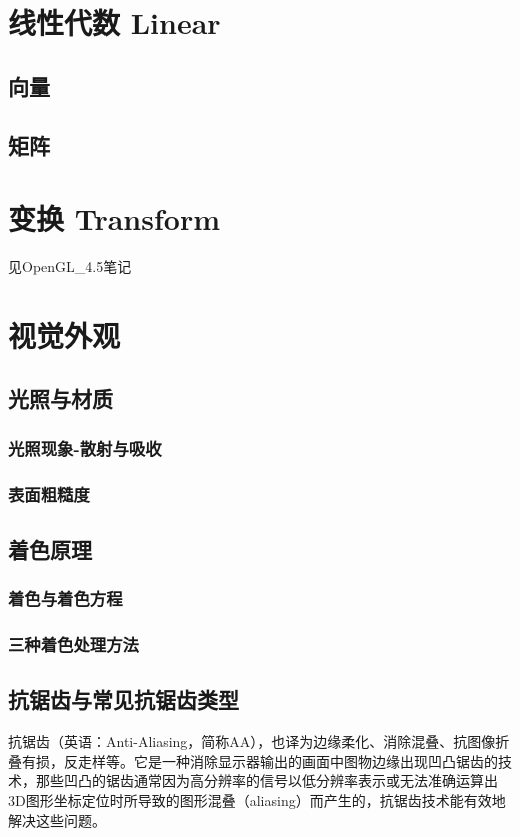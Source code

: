 \documentclass[UTF8,a4paper,12pt]{ctexbook}
\begin{document}
\chapter{线性代数 Linear}
	\section{向量}
	
	\section{矩阵}


		
\chapter{变换 Transform}
	见OpenGL\_4.5笔记


\chapter{视觉外观}
	\section{光照与材质}
		\subsection{光照现象-散射与吸收}
		
		\subsection{表面粗糙度}
		

	\section{着色原理}
		\subsection{着色与着色方程}
		
		\subsection{三种着色处理方法}
		
		
	\section{抗锯齿与常见抗锯齿类型}
		抗锯齿（英语：Anti-Aliasing，简称AA），也译为边缘柔化、消除混叠、抗图像折叠有损，反走样等。它是一种消除显示器输出的画面中图物边缘出现凹凸锯齿的技术，那些凹凸的锯齿通常因为高分辨率的信号以低分辨率表示或无法准确运算出3D图形坐标定位时所导致的图形混叠（aliasing）而产生的，抗锯齿技术能有效地解决这些问题。
		
\end{document}
